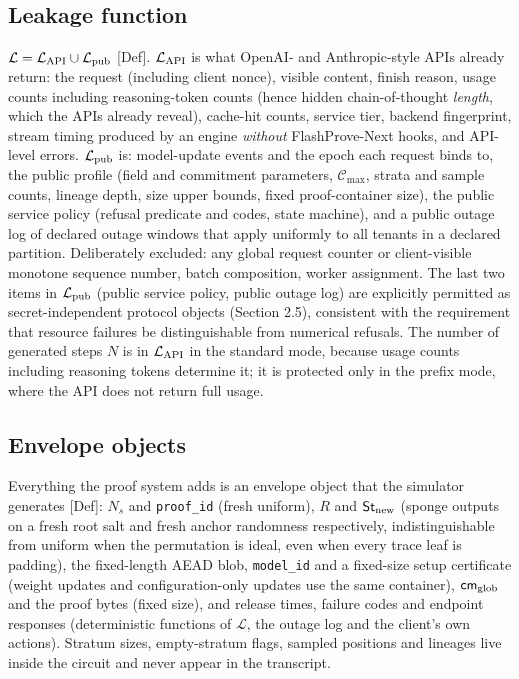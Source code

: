 \documentclass[10pt]{article}
\begin{document}
\subsection{Leakage function}
$\mathcal L=\mathcal L_{\rm API}\cup\mathcal L_{\rm pub}$ [Def]. $\mathcal L_{\rm API}$ is what OpenAI- and Anthropic-style APIs already return: the request (including client nonce), visible content, finish reason, usage counts including reasoning-token counts (hence hidden chain-of-thought \emph{length}, which the APIs already reveal), cache-hit counts, service tier, backend fingerprint, stream timing produced by an engine \emph{without} FlashProve-Next hooks, and API-level errors. $\mathcal L_{\rm pub}$ is: model-update events and the epoch each request binds to, the public profile (field and commitment parameters, $\mathcal C_{\max}$, strata and sample counts, lineage depth, size upper bounds, fixed proof-container size), the public service policy (refusal predicate and codes, state machine), and a public outage log of declared outage windows that apply uniformly to all tenants in a declared partition. Deliberately excluded: any global request counter or client-visible monotone sequence number, batch composition, worker assignment. The last two items in $\mathcal L_{\rm pub}$ (public service policy, public outage log) are explicitly permitted as secret-independent protocol objects (Section 2.5), consistent with the requirement that resource failures be distinguishable from numerical refusals. The number of generated steps $N$ is in $\mathcal L_{\rm API}$ in the standard mode, because usage counts including reasoning tokens determine it; it is protected only in the prefix mode, where the API does not return full usage.

\subsection{Envelope objects}
Everything the proof system adds is an envelope object that the simulator generates [Def]: $N_s$ and \texttt{proof\_\allowbreak{}id} (fresh uniform), $R$ and $\mathsf{St}_{\rm new}$ (sponge outputs on a fresh root salt and fresh anchor randomness respectively, indistinguishable from uniform when the permutation is ideal, even when every trace leaf is padding), the fixed-length AEAD blob, \texttt{model\_\allowbreak{}id} and a fixed-size setup certificate (weight updates and configuration-only updates use the same container), $\mathsf{cm}_{\rm glob}$ and the proof bytes (fixed size), and release times, failure codes and endpoint responses (deterministic functions of $\mathcal L$, the outage log and the client's own actions). Stratum sizes, empty-stratum flags, sampled positions and lineages live inside the circuit and never appear in the transcript.
\end{document}
